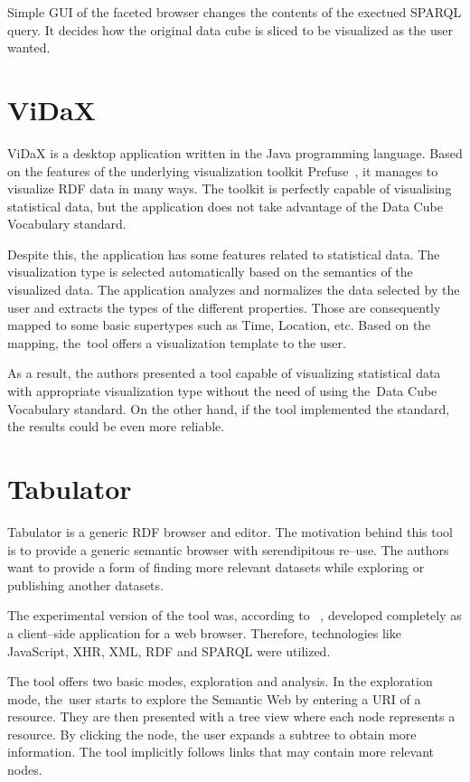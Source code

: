 Simple GUI of the faceted browser changes the contents of the exectued SPARQL query. 
It decides how the original data cube is sliced to be visualized as the user 
wanted.

\section{ViDaX}
ViDaX is a desktop application written in the Java programming language. Based on the features
of the underlying visualization toolkit Prefuse~\cite{prefuse}, it manages to 
visualize RDF data in many ways. The toolkit is perfectly capable of 
visualising statistical data, but the application does not take advantage of the 
Data Cube Vocabulary standard.

Despite this, the application has some features related to statistical 
data. The visualization type is selected automatically based on the semantics of the 
visualized data. The application analyzes and normalizes the data selected by the user 
and extracts the types of the different properties. Those are consequently mapped to 
some basic supertypes such as Time, Location, etc. Based on the mapping,
the~tool offers a visualization template to the user.

As a result, the authors presented a tool capable of visualizing 
statistical data with appropriate visualization type without the need of using 
the~Data Cube Vocabulary standard. On the other hand, if the tool 
implemented the standard, the results could be even more reliable.

\section{Tabulator}
\label{sec:rw:tabulator}
Tabulator is a generic RDF browser and editor. The motivation behind this tool
is to provide a generic semantic browser with serendipitous re--use. The authors 
want to provide a form of finding more relevant datasets while exploring or 
publishing another datasets. 

The experimental version of the tool was, according to ~\cite{tabulator}, 
developed completely as a client--side application for a web browser. Therefore, 
technologies like JavaScript, XHR, XML, RDF and SPARQL were utilized.

The tool offers two basic modes, exploration and analysis. In the exploration mode,
the~user starts to explore the Semantic Web by entering a URI of a resource. They 
are then presented with a tree view where each node represents a resource. 
By clicking the node, the user expands a subtree to obtain more information.
The tool implicitly follows links that may contain more relevant nodes.

